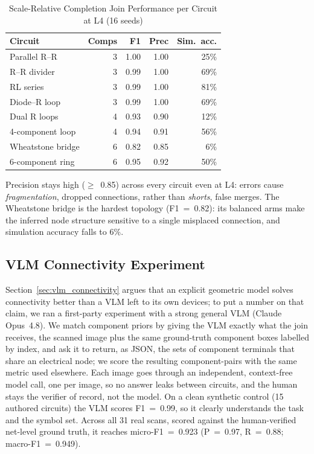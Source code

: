 \documentclass{ieeeaccess}
\begin{document}
\begin{table}[htbp]
\caption{Scale-Relative Completion Join Performance per Circuit at L4 (16 seeds)}
\label{tab:per_circuit}
\begin{center}
\begin{tabular}{lrrrr}
\toprule
\textbf{Circuit} & \textbf{Comps} & \textbf{F1} & \textbf{Prec} & \textbf{Sim.\ acc.} \\
\midrule
Parallel R--R & 3 & 1.00 & 1.00 & 25\% \\
R--R divider & 3 & 0.99 & 1.00 & 69\% \\
RL series & 3 & 0.99 & 1.00 & 81\% \\
Diode--R loop & 3 & 0.99 & 1.00 & 69\% \\
Dual R loops & 4 & 0.93 & 0.90 & 12\% \\
4-component loop & 4 & 0.94 & 0.91 & 56\% \\
Wheatstone bridge & 6 & 0.82 & 0.85 & 6\% \\
6-component ring & 6 & 0.95 & 0.92 & 50\% \\
\bottomrule
\end{tabular}
\end{center}
\end{table}

Precision stays high ($\geq$~0.85) across every circuit even at L4: errors cause \emph{fragmentation}, dropped connections, rather than \emph{shorts}, false merges. The Wheatstone bridge is the hardest topology (F1~=~0.82): its balanced arms make the inferred node structure sensitive to a single misplaced connection, and simulation accuracy falls to 6\%.

\subsection{VLM Connectivity Experiment}
\label{sec:vlm_results}

Section~\ref{sec:vlm_connectivity} argues that an explicit geometric model solves connectivity better than a VLM left to its own devices; to put a number on that claim, we ran a first-party experiment with a strong general VLM (Claude Opus~4.8). We match component priors by giving the VLM exactly what the join receives, the scanned image plus the same ground-truth component boxes labelled by index, and ask it to return, as JSON, the sets of component terminals that share an electrical node; we score the resulting component-pairs with the same metric used elsewhere. Each image goes through an independent, context-free model call, one per image, so no answer leaks between circuits, and the human stays the verifier of record, not the model. On a clean synthetic control (15 authored circuits) the VLM scores F1~=~0.99, so it clearly understands the task and the symbol set. Across all 31 real scans, scored against the human-verified net-level ground truth, it reaches micro-F1~=~0.923 (P~=~0.97, R~=~0.88; macro-F1~=~0.949).
\end{document}
